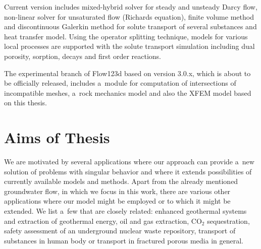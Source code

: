 Current version includes mixed-hybrid solver for steady and unsteady Darcy flow, non-linear solver for unsaturated flow (Richards equation),
finite volume method and discontinuous Galerkin method for solute transport of several substances and heat transfer model. 
Using the operator splitting technique, models for various local processes are supported with the solute transport simulation
including dual porosity, sorption, decays and first order reactions.

The experimental branch of Flow123d based on version 3.0.x, which is about to be officially released,
includes a~module for computation of intersections of incompatible meshes,
a~rock mechanics model and also the XFEM model based on this thesis.






\section{Aims of Thesis}\label{chap:aims}

We are motivated by several applications where our approach can provide a~new solution of problems with singular behavior
and where it extends possibilities of currently available models and methods.
Apart from the already mentioned groundwater flow, in which we focus in this work, there are various other applications
where our model might be employed or to which it might be extended.
We list a~few that are closely related: enhanced geothermal systems and extraction of geothermal energy,
oil and gas extraction, CO$_2$ sequestration, safety assessment of an underground nuclear waste repository,
transport of substances in human body or transport in fractured porous media in general.

